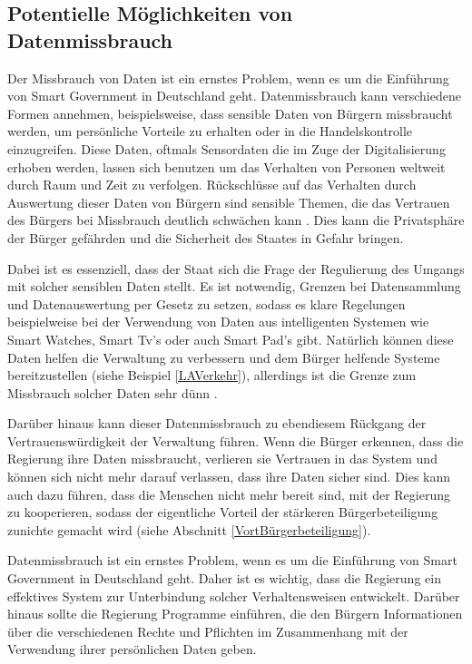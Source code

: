 \subsection{Potentielle Möglichkeiten von Datenmissbrauch}
Der Missbrauch von Daten ist ein ernstes Problem, wenn es um die Einführung von Smart Government in Deutschland geht.
Datenmissbrauch kann verschiedene Formen annehmen, beispielsweise, dass sensible Daten von Bürgern missbraucht werden, um persönliche Vorteile zu erhalten oder in die Handelskontrolle einzugreifen.
Diese Daten, oftmals Sensordaten die im Zuge der Digitalisierung erhoben werden, lassen sich benutzen um das Verhalten von Personen weltweit durch Raum und Zeit zu verfolgen.
Rückschlüsse auf das Verhalten durch Auswertung dieser Daten von Bürgern sind sensible Themen, die das Vertrauen des Bürgers bei Missbrauch deutlich schwächen kann \citep[Vgl.][S.179]{von_Lucke_2016}.
Dies kann die Privatsphäre der Bürger gefährden und die Sicherheit des Staates in Gefahr bringen.
\par
Dabei ist es essenziell, dass der Staat sich die Frage der Regulierung des Umgangs mit solcher sensiblen Daten stellt.
Es ist notwendig, Grenzen bei Datensammlung und Datenauswertung  per Gesetz zu setzen, sodass es klare Regelungen beispielweise bei der Verwendung von Daten aus intelligenten Systemen wie Smart Watches, Smart Tv's oder auch Smart Pad's gibt.
Natürlich können diese Daten helfen die Verwaltung zu verbessern und dem Bürger helfende Systeme bereitzustellen (siehe Beispiel \ref{LAVerkehr}), allerdings ist die Grenze zum Missbrauch solcher Daten sehr dünn \citep[Vgl.][S. 39]{Lucke2016}.
\par
Darüber hinaus kann dieser Datenmissbrauch zu ebendiesem Rückgang der Vertrauenswürdigkeit der Verwaltung führen.
Wenn die Bürger erkennen, dass die Regierung ihre Daten missbraucht, verlieren sie Vertrauen in das System und können sich nicht mehr darauf verlassen, dass ihre Daten sicher sind.
Dies kann auch dazu führen, dass die Menschen nicht mehr bereit sind, mit der Regierung zu kooperieren, sodass der eigentliche Vorteil der stärkeren Bürgerbeteiligung zunichte gemacht wird (siehe Abschnitt \ref{VortBürgerbeteiligung}).
\par
Datenmissbrauch ist ein ernstes Problem, wenn es um die Einführung von Smart Government in Deutschland geht.
Daher ist es wichtig, dass die Regierung ein effektives System zur Unterbindung solcher Verhaltensweisen entwickelt.
Darüber hinaus sollte die Regierung Programme einführen, die den Bürgern Informationen über die verschiedenen Rechte und Pflichten im Zusammenhang mit der Verwendung ihrer persönlichen Daten geben.